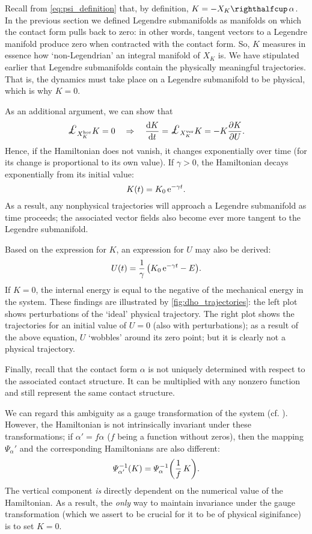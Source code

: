 Recall from \cref{eq:psi_definition} that, by definition, $K = -\intpr{X_K}{\alpha}$. In the previous section we defined Legendre submanifolds as manifolds on which the contact form pulls back to zero: in other words, tangent vectors to a Legendre manifold produce zero when contracted with the contact form. So, $K$ measures in essence how `non-Legendrian' an integral manifold of $X_K$ is. We have stipulated earlier that Legendre submanifolds contain the physically meaningful trajectories. That is, the dynamics must take place on a Legendre submanifold to be physical, which is why $K = 0$.

As an additional argument, we can show that
$$ \lied{X^{\text{hor}}_K}{K} = 0 \quad \Rightarrow \quad \dv{K}{t} = \lied{X^{\text{ver}}_K}{K} = -K\pdv{K}{U}. $$
Hence, if the Hamiltonian does not vanish, it changes exponentially over time (for its change is proportional to its own value). If $\gamma > 0$, the Hamiltonian decays exponentially from its initial value:
\begin{equation} 
    K(t) = K_0\,\mathrm{e}^{-\gamma t}.
    \label{eq:contact_ham_growth}
\end{equation}
As a result, any nonphysical trajectories will approach a Legendre submanifold as time proceeds; the associated vector fields also become ever more tangent to the Legendre submanifold. 

Based on the expression for $K$, an expression for $U$ may also be derived:
$$ U(t) = \frac{1}{\gamma}\,\qty( K_0\,\mathrm{e}^{-\gamma t} - E ). $$
If $K = 0$, the internal energy is equal to the negative of the mechanical energy in the system. These findings are illustrated by \cref{fig:dho_trajectories}: the left plot shows perturbations of the `ideal' physical trajectory. The right plot shows the trajectories for an initial value of $U = 0$ (also with perturbations); as a result of the above equation, $U$ `wobbles' around its zero point; but it is clearly not a physical trajectory.

Finally, recall that the contact form $\alpha$ is not uniquely determined with respect to the associated contact structure. It can be multiplied with any nonzero function and still represent the same contact structure.

We can regard this ambiguity as a gauge transformation of the system (cf. \citet{Balian2001}). However, the Hamiltonian is not intrinsically invariant under these transformations; if $ \alpha' = f \alpha $ ($f$ being a function without zeros), then the mapping $\Psi_\alpha'$ and the corresponding Hamiltonians are also different: \cite[p. 321]{Libermann1987} 
\begin{equation}
    \Psi^{-1}_{\alpha'}(K) = \Psi^{-1}_{\alpha}\qty(\frac{1}{f}\,K).
    \label{eq:contact_ham_scaling}
\end{equation}
The vertical component \emph{is} directly dependent on the numerical value of the Hamiltonian. As a result, the \emph{only} way to maintain invariance under the gauge transformation (which we assert to be crucial for it to be of physical siginifance) is to set $K = 0$.

